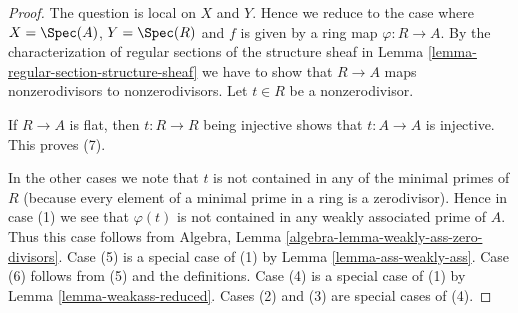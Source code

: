 \begin{proof}
The question is local on $X$ and $Y$. Hence we reduce to the case where
$X = \Spec(A)$, $Y = \Spec(R)$ and $f$ is given by a ring map
$\varphi : R \to A$.
By the characterization of regular sections of the structure sheaf
in Lemma \ref{lemma-regular-section-structure-sheaf} we have to
show that $R \to A$ maps nonzerodivisors to nonzerodivisors.
Let $t \in R$ be a nonzerodivisor.

\medskip\noindent
If $R \to A$ is flat, then $t : R \to R$ being injective
shows that $t : A \to A$ is injective. This proves (7).

\medskip\noindent
In the other cases we note that $t$ is not contained in any of
the minimal primes of $R$ (because every element of a minimal
prime in a ring is a zerodivisor).
Hence in case (1) we see that $\varphi(t)$ is not contained
in any weakly associated prime of $A$. Thus this case follows from
Algebra, Lemma \ref{algebra-lemma-weakly-ass-zero-divisors}.
Case (5) is a special case of (1) by Lemma \ref{lemma-ass-weakly-ass}.
Case (6) follows from (5) and the definitions.
Case (4) is a special case of (1) by
Lemma \ref{lemma-weakass-reduced}.
Cases (2) and (3) are special cases of (4).
\end{proof}


